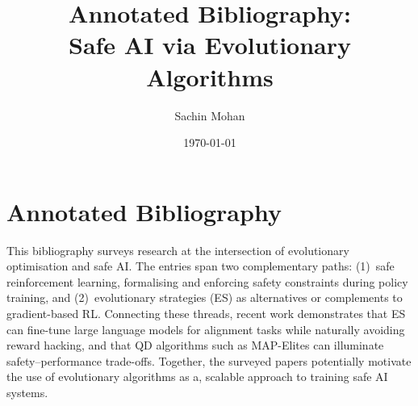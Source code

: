 \documentclass[12pt, a4paper]{article}
\title{Annotated Bibliography:\\Safe AI via Evolutionary Algorithms}
\author{Sachin Mohan}
\date{\today}
\begin{document}
\maketitle

\section*{Annotated Bibliography}

This bibliography surveys research at the intersection of evolutionary optimisation and safe AI. The entries span two complementary paths: (1)~safe reinforcement learning, formalising and enforcing safety constraints during policy training, and (2)~evolutionary strategies (ES) as alternatives or complements to gradient-based RL. Connecting these threads, recent work demonstrates that ES can fine-tune large language models for alignment tasks while naturally avoiding reward hacking, and that QD algorithms such as MAP-Elites can illuminate safety--performance trade-offs. Together, the surveyed papers potentially motivate the use of evolutionary algorithms as a, scalable approach to training safe AI systems.
\end{document}
